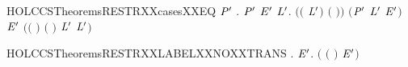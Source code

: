 \begin{SaveVerbatim}{HOLCCSTheoremsRESTRXXcasesXXEQ}
\HOLTokenTurnstile{} \HOLSymConst{\HOLTokenForall{}}\ensuremath{\HOLBoundVar{P}\sp{\prime{}}}   .
        \HOLTokenTransBegin{}\HOLTokenTransEnd \ensuremath{\HOLBoundVar{P}\sp{\prime{}}} \HOLSymConst{\HOLTokenEquiv{}}
     \HOLSymConst{\HOLTokenExists{}} \ensuremath{\HOLBoundVar{E}\sp{\prime{}}}  \ensuremath{\HOLBoundVar{L}\sp{\prime{}}}.
       \ensuremath{(}\ensuremath{(} \HOLSymConst{\ensuremath{=}} \ensuremath{\HOLBoundVar{L}\sp{\prime{}}}\ensuremath{)} \HOLSymConst{\HOLTokenConj{}} \ensuremath{(} \HOLSymConst{\ensuremath{=}} \ensuremath{)}\ensuremath{)} \HOLSymConst{\HOLTokenConj{}} \ensuremath{(}\ensuremath{\HOLBoundVar{P}\sp{\prime{}}} \HOLSymConst{\ensuremath{=}}  \ensuremath{\HOLBoundVar{L}\sp{\prime{}}} \ensuremath{\HOLBoundVar{E}\sp{\prime{}}}\ensuremath{)} \HOLSymConst{\HOLTokenConj{}}  \HOLTokenTransBegin{}\HOLTokenTransEnd \ensuremath{\HOLBoundVar{E}\sp{\prime{}}} \HOLSymConst{\HOLTokenConj{}}
       \ensuremath{(}\ensuremath{(} \HOLSymConst{\ensuremath{=}} \HOLConst{\ensuremath{\tau}}\ensuremath{)} \HOLSymConst{\HOLTokenDisj{}} \ensuremath{(} \HOLSymConst{\ensuremath{=}}  \ensuremath{)} \HOLSymConst{\HOLTokenConj{}}  \HOLConst{\HOLTokenNotIn{}} \ensuremath{\HOLBoundVar{L}\sp{\prime{}}} \HOLSymConst{\HOLTokenConj{}}   \HOLConst{\HOLTokenNotIn{}} \ensuremath{\HOLBoundVar{L}\sp{\prime{}}}\ensuremath{)}
\end{SaveVerbatim}
\newcommand{\HOLCCSTheoremsRESTRXXcasesXXEQ}{\UseVerbatim{HOLCCSTheoremsRESTRXXcasesXXEQ}}
\begin{SaveVerbatim}{HOLCCSTheoremsRESTRXXLABELXXNOXXTRANS}
\HOLTokenTurnstile{} \HOLSymConst{\HOLTokenForall{}} .
      \HOLConst{\HOLTokenIn{}}  \HOLSymConst{\HOLTokenDisj{}}   \HOLConst{\HOLTokenIn{}}  \HOLSymConst{\HOLTokenImp{}} \HOLSymConst{\HOLTokenForall{}}  \ensuremath{\HOLBoundVar{E}\sp{\prime{}}}. \HOLSymConst{\HOLTokenNeg{}}\ensuremath{(}  \ensuremath{(} \HOLSymConst{\ensuremath{\ldotp}}\ensuremath{)} \HOLTokenTransBegin{}\HOLTokenTransEnd \ensuremath{\HOLBoundVar{E}\sp{\prime{}}}\ensuremath{)}
\end{SaveVerbatim}
